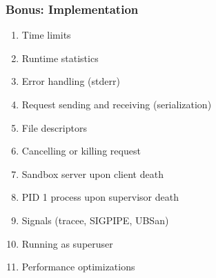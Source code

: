 \documentclass{beamer}
\begin{document}
\begin{frame}
    \frametitle{Bonus: Implementation}

    \begin{enumerate}
        \item Time limits
        \item Runtime statistics
        \item Error handling (stderr)
        \item Request sending and receiving (serialization)
        \item File descriptors
        \item Cancelling or killing request
        \item Sandbox server upon client death
        \item PID 1 process upon supervisor death
        \item Signals (tracee, SIGPIPE, UBSan)
        \item Running as superuser
        \item Performance optimizations
    \end{enumerate}
\end{frame}
\end{document}
